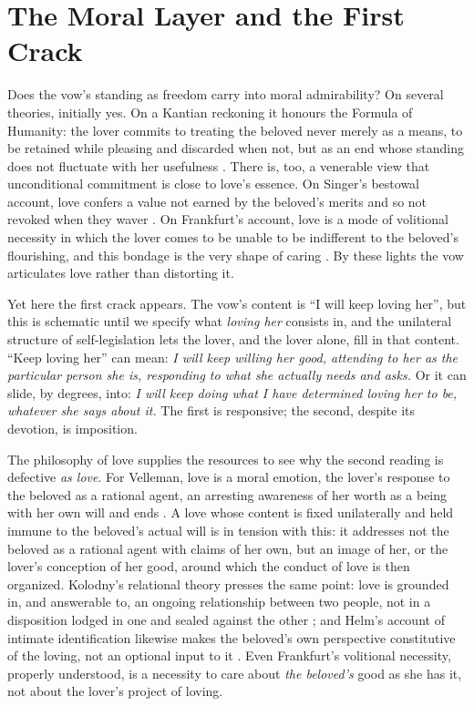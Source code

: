 \section{The Moral Layer and the First Crack}\label{p03:sec:moral}

Does the vow's standing as freedom carry into moral admirability? On several theories, initially yes. On a Kantian reckoning it honours the Formula of Humanity: the lover commits to treating the beloved never merely as a means, to be retained while pleasing and discarded when not, but as an end whose standing does not fluctuate with her usefulness \parencite[4:429]{kant1785groundwork}. There is, too, a venerable view that unconditional commitment is close to love's essence. On Singer's bestowal account, love confers a value not earned by the beloved's merits and so not revoked when they waver \parencite{singer1991nature}. On Frankfurt's account, love is a mode of volitional necessity in which the lover comes to be unable to be indifferent to the beloved's flourishing, and this bondage is the very shape of caring \parencite{frankfurt2004reasons}. By these lights the vow articulates love rather than distorting it.

Yet here the first crack appears. The vow's content is ``I will keep loving her'', but this is schematic until we specify what \emph{loving her} consists in, and the unilateral structure of self-legislation lets the lover, and the lover alone, fill in that content. ``Keep loving her'' can mean: \emph{I will keep willing her good, attending to her as the particular person she is, responding to what she actually needs and asks.} Or it can slide, by degrees, into: \emph{I will keep doing what I have determined loving her to be, whatever she says about it.} The first is responsive; the second, despite its devotion, is imposition.

The philosophy of love supplies the resources to see why the second reading is defective \emph{as love}. For Velleman, love is a moral emotion, the lover's response to the beloved as a rational agent, an arresting awareness of her worth as a being with her own will and ends \parencite{velleman1999love}. A love whose content is fixed unilaterally and held immune to the beloved's actual will is in tension with this: it addresses not the beloved as a rational agent with claims of her own, but an image of her, or the lover's conception of her good, around which the conduct of love is then organized. Kolodny's relational theory presses the same point: love is grounded in, and answerable to, an ongoing relationship between two people, not in a disposition lodged in one and sealed against the other \parencite{kolodny2003love}; and Helm's account of intimate identification likewise makes the beloved's own perspective constitutive of the loving, not an optional input to it \parencite{helm2010love}. Even Frankfurt's volitional necessity, properly understood, is a necessity to care about \emph{the beloved's} good as she has it, not about the lover's project of loving.

